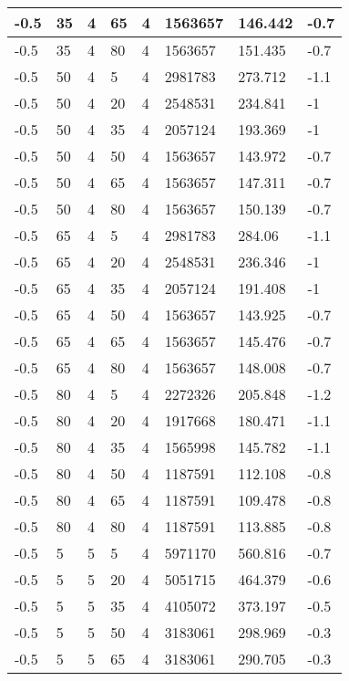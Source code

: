\begin{longtable}{|p{1.4cm}|p{1.4cm}|p{1.4cm}|p{1.4cm}|p{1.4cm}|p{1.4cm}|p{1.4cm}|p{1.5cm}|}
        -0.5 & 35 & 4 & 65 & 4 & 1563657 & 146.442 & -0.7 \\ \hline
        -0.5 & 35 & 4 & 80 & 4 & 1563657 & 151.435 & -0.7 \\ \hline
        -0.5 & 50 & 4 & 5 & 4 & 2981783 & 273.712 & -1.1 \\ \hline
        -0.5 & 50 & 4 & 20 & 4 & 2548531 & 234.841 & -1 \\ \hline
        -0.5 & 50 & 4 & 35 & 4 & 2057124 & 193.369 & -1 \\ \hline
        -0.5 & 50 & 4 & 50 & 4 & 1563657 & 143.972 & -0.7 \\ \hline
        -0.5 & 50 & 4 & 65 & 4 & 1563657 & 147.311 & -0.7 \\ \hline
        -0.5 & 50 & 4 & 80 & 4 & 1563657 & 150.139 & -0.7 \\ \hline
        -0.5 & 65 & 4 & 5 & 4 & 2981783 & 284.06 & -1.1 \\ \hline
        -0.5 & 65 & 4 & 20 & 4 & 2548531 & 236.346 & -1 \\ \hline
        -0.5 & 65 & 4 & 35 & 4 & 2057124 & 191.408 & -1 \\ \hline
        -0.5 & 65 & 4 & 50 & 4 & 1563657 & 143.925 & -0.7 \\ \hline
        -0.5 & 65 & 4 & 65 & 4 & 1563657 & 145.476 & -0.7 \\ \hline
        -0.5 & 65 & 4 & 80 & 4 & 1563657 & 148.008 & -0.7 \\ \hline
        -0.5 & 80 & 4 & 5 & 4 & 2272326 & 205.848 & -1.2 \\ \hline
        -0.5 & 80 & 4 & 20 & 4 & 1917668 & 180.471 & -1.1 \\ \hline
        -0.5 & 80 & 4 & 35 & 4 & 1565998 & 145.782 & -1.1 \\ \hline
        -0.5 & 80 & 4 & 50 & 4 & 1187591 & 112.108 & -0.8 \\ \hline
        -0.5 & 80 & 4 & 65 & 4 & 1187591 & 109.478 & -0.8 \\ \hline
        -0.5 & 80 & 4 & 80 & 4 & 1187591 & 113.885 & -0.8 \\ \hline
        -0.5 & 5 & 5 & 5 & 4 & 5971170 & 560.816 & -0.7 \\ \hline
        -0.5 & 5 & 5 & 20 & 4 & 5051715 & 464.379 & -0.6 \\ \hline
        -0.5 & 5 & 5 & 35 & 4 & 4105072 & 373.197 & -0.5 \\ \hline
        -0.5 & 5 & 5 & 50 & 4 & 3183061 & 298.969 & -0.3 \\ \hline
        -0.5 & 5 & 5 & 65 & 4 & 3183061 & 290.705 & -0.3 \\ \hline

\end{longtable}
